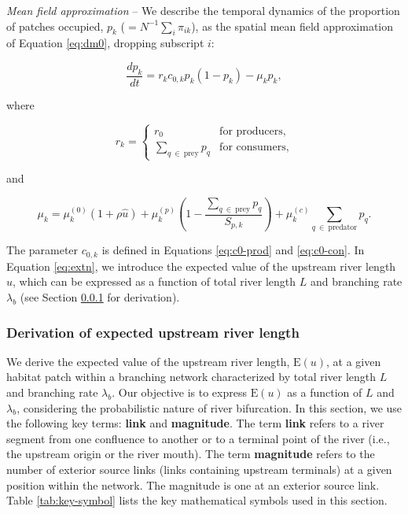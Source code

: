 \documentclass[11pt, class=article, crop=false]{standalone}
\begin{document}
\textit{Mean field approximation} --
We describe the temporal dynamics of the proportion of patches occupied, $p_k$ ($= N^{-1} \sum_i \pi_{ik}$), as the spatial mean field approximation of Equation \ref{eq:dm0}, dropping subscript $i$:

\begin{equation}
    \frac{dp_k}{dt} = r_{k} c_{0, k} p_{k} (1 - p_{k}) - \mu_{k} p_{k},
    \label{eq:master}
\end{equation}

where

\begin{equation}
    r_{k} = 
    \begin{cases}
        r_0 & \text{for producers,}\\
        \sum_{q~\in~\text{prey}} p_{q} & \text{for consumers,}
    \end{cases}
\end{equation}

and

\begin{equation}
    \mu_{k} = 
        \mu_{k}^{(0)} (1 + \rho \hat{u}) + 
        \mu_{k}^{(p)} \left(1 - \frac{\sum_{q~\in~\text{prey}} p_{q}}{S_{p, k}} \right) + 
        \mu_{k}^{(c)} \sum_{q~\in~\text{predator}} p_{q}.
    \label{eq:extn}    
\end{equation}

The parameter $c_{0, k}$ is defined in Equations \ref{eq:c0-prod} and \ref{eq:c0-con}. 
In Equation \ref{eq:extn}, we introduce the expected value of the upstream river length $\hat{u}$, which can be expressed as a function of total river length $L$ and branching rate $\lambda_b$ (see Section \ref{updist} for derivation).

\subsubsection{Derivation of expected upstream river length} \label{updist}

We derive the expected value of the upstream river length, $\mbox{E}(u)$, at a given habitat patch within a branching network characterized by total river length $L$ and branching rate $\lambda_b$.
Our objective is to express $\mbox{E}(u)$ as a function of $L$ and $\lambda_b$, considering the probabilistic nature of river bifurcation.
In this section, we use the following key terms: \textbf{link} and \textbf{magnitude}.
The term \textbf{link} refers to a river segment from one confluence to another or to a terminal point of the river (i.e., the upstream origin or the river mouth).
The term \textbf{magnitude} refers to the number of exterior source links (links containing upstream terminals) at a given position within the network. The magnitude is one at an exterior source link.
Table \ref{tab:key-symbol} lists the key mathematical symbols used in this section.
\end{document}
